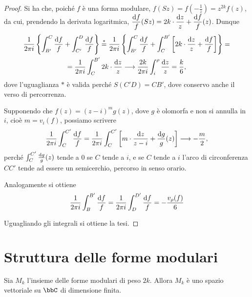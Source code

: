\begin{proof}
	Si ha che, poiché $f$ è una forma modulare, $f(Sz)=f(-\frac{1}{z})=z^{2k}f(z)$, da cui, prendendo la derivata logaritmica,
	$\displaystyle\frac{\text{d} f}{f}(Sz)=2k\cdot\frac{\text{d} z}{z}+\frac{\text{d} f}{f}(z)$. Dunque
	\begin{multline}
		\frac{1}{2\pi i}\left\{ \int_{B'}^C\frac{\de f}{f} + \int_{C'}^D\frac{\de f}{f} \right\} \overset{*}{=} %
		\frac{1}{2\pi i}\left\{ \int_{B'}^C\frac{\de f}{f} + \int_{C}^{B'} \left[2k \cdot \frac{\de z}{z} + \frac{\de f}{f}\right] \right\} = \\
		= \frac{1}{2\pi i}\int_{C}^{B'} 2k \cdot \frac{\de z}{z} \longrightarrow \frac{2k}{2\pi i}\int_i^\rho \frac{\de z}{z} = \frac{k}{6},
	\end{multline}
	dove l'uguaglianza $*$ è valida perché $S(C'D)=CB'$, dove conservo anche il verso di percorrenza.

	Supponendo che $f(z)=(z-i)^mg(z)$, dove $g$ è olomorfa e non si annulla in $i$, cioè $m=v_i(f)$, possiamo scrivere
	\begin{equation*}
		\frac{1}{2\pi i}\int_C^{C'}\frac{\de f}{f} = \frac{1}{2\pi i}\int_C^{C'}\left[ m\cdot\frac{\de z}{z-i} + %
		\frac{\de g}{g}(z) \right] \longrightarrow -\frac{m}{2},
	\end{equation*}
	perché $\int_C^{C'}\frac{\text{d} g}{g}(z)$ tende a $0$ se $C$ tende a $i$, e se $C$ tende a $i$ l'arco di circonferenza $CC'$ tende ad essere un semicerchio, percorso in senso orario.

	Analogamente si ottiene
	\begin{equation*}
		\frac{1}{2\pi i}\int_B^{B'}\frac{\text{d} f}{f}=\frac{1}{2\pi i}\int_D^{D'}\frac{\text{d} f}{f}=-\frac{v_\rho(f)}{6}
	\end{equation*}

	Uguagliando gli integrali si ottiene la tesi.
\end{proof}

\section{Struttura delle forme modulari}

\begin{corollario}
	Sia $M_k$ l'insieme delle forme modulari di peso $2k$. Allora $M_k$ è uno spazio vettoriale su $\bbC$ di dimensione finita.
\end{corollario}

